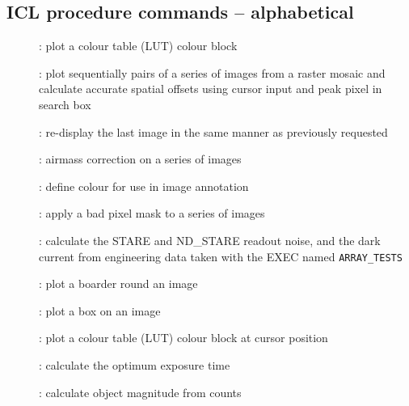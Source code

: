 
\subsection{\label{ss:icl_procedure_commands_alpha}ICL procedure commands -- alphabetical}

\begin{description}
\begin{description}

\item []: plot a colour table (LUT) colour block

\item []: plot sequentially pairs of a series
of images from a raster mosaic and calculate accurate spatial offsets
using cursor input and peak pixel in search box

\item []: re-display the last image in the same
manner as previously requested

\item []: airmass correction on a series
of images

\item []: define colour for use in image annotation

\item []: apply a bad pixel mask to
a series of images

\item []: calculate the STARE and
ND\_STARE readout noise, and the dark current from engineering data
taken with the EXEC named {\tt ARRAY\_TESTS}

\item []: plot a boarder round an image

\item []: plot a box on an image

\item []: plot a colour table (LUT) colour
block at cursor position

\item []: calculate the optimum exposure time

\item []: calculate object magnitude from counts


\end{description}
\end{description}
